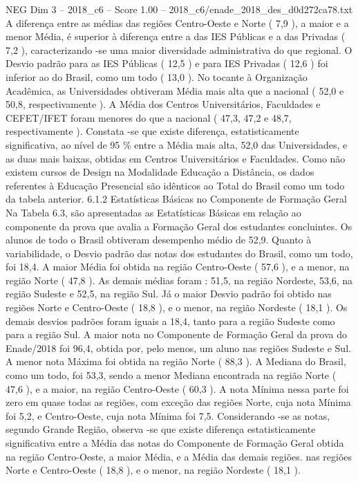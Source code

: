 \begin{textsample}{NEG Dim 3 – 2018\_c6 – Score 1.00 – 2018\_c6/enade\_2018\_des\_d0d272ca78.txt}
A diferença entre as médias das regiões Centro-Oeste e Norte ( 7,9 ), a maior e a menor Média, é superior à diferença entre a das IES Públicas e a das Privadas ( 7,2 ), caracterizando -se uma maior diversidade administrativa do que regional.
O Desvio padrão para as IES Públicas ( 12,5 ) e para IES Privadas ( 12,6 ) foi inferior ao do Brasil, como um todo ( 13,0 ).
No tocante à Organização Acadêmica, as Universidades obtiveram Média mais alta que a nacional ( 52,0 e 50,8, respectivamente ).
A Média dos Centros Universitários, Faculdades e CEFET/IFET foram menores do que a nacional ( 47,3, 47,2 e 48,7, respectivamente ).
Constata -se que existe diferença, estatisticamente significativa, ao nível de 95 \% entre a Média mais alta, 52,0 das Universidades, e as duas mais baixas, obtidas em Centros Universitários e Faculdades.
Como não existem cursos de Design na Modalidade Educação a Distância, os dados referentes à Educação Presencial são idênticos ao Total do Brasil como um todo da tabela anterior. 6.1.2 Estatísticas Básicas no Componente de Formação Geral Na Tabela 6.3, são apresentadas as Estatísticas Básicas em relação ao componente da prova que avalia a Formação Geral dos estudantes concluintes.
Os alunos de todo o Brasil obtiveram desempenho médio de 52,9.
Quanto à variabilidade, o Desvio padrão das notas dos estudantes do Brasil, como um todo, foi 18,4.
A maior Média foi obtida na região Centro-Oeste ( 57,6 ), e a menor, na região Norte ( 47,8 ).
As demais médias foram : 51,5, na região Nordeste, 53,6, na região Sudeste e 52,5, na região Sul.
Já o maior Desvio padrão foi obtido nas regiões Norte e Centro-Oeste ( 18,8 ), e o menor, na região Nordeste ( 18,1 ).
Os demais desvios padrões foram iguais a 18,4, tanto para a região Sudeste como para a região Sul.
A maior nota no Componente de Formação Geral da prova do Enade/2018 foi 96,4, obtida por, pelo menos, um aluno nas regiões Sudeste e Sul.
A menor nota Máxima foi obtida na região Norte ( 88,3 ).
A Mediana do Brasil, como um todo, foi 53,3, sendo a menor Mediana encontrada na região Norte ( 47,6 ), e a maior, na região Centro-Oeste ( 60,3 ).
A nota Mínima nessa parte foi zero em quase todas as regiões, com exceção das regiões Norte, cuja nota Mínima foi 5,2, e Centro-Oeste, cuja nota Mínima foi 7,5.
Considerando -se as notas, segundo Grande Região, observa -se que existe diferença estatisticamente significativa entre a Média das notas do Componente de Formação Geral obtida na região Centro-Oeste, a maior Média, e a Média das demais regiões. nas regiões Norte e Centro-Oeste ( 18,8 ), e o menor, na região Nordeste ( 18,1 ).

\end{textsample}
